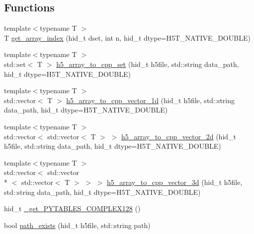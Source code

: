 \subsection*{Functions}
\begin{DoxyCompactItemize}
\item 
{\footnotesize template$<$typename T $>$ }\\T \hyperlink{namespaceh5wrap_aa1fe2dffc1fcbde11e7ceaf3fcc57cfd}{get\-\_\-array\-\_\-index} (hid\-\_\-t dset, int n, hid\-\_\-t dtype=H5\-T\-\_\-\-N\-A\-T\-I\-V\-E\-\_\-\-D\-O\-U\-B\-L\-E)
\item 
{\footnotesize template$<$typename T $>$ }\\std\-::set$<$ T $>$ \hyperlink{namespaceh5wrap_ab8c97f180ec4885c15b275a41447912f}{h5\-\_\-array\-\_\-to\-\_\-cpp\-\_\-set} (hid\-\_\-t h5file, std\-::string data\-\_\-path, hid\-\_\-t dtype=H5\-T\-\_\-\-N\-A\-T\-I\-V\-E\-\_\-\-D\-O\-U\-B\-L\-E)
\item 
{\footnotesize template$<$typename T $>$ }\\std\-::vector$<$ T $>$ \hyperlink{namespaceh5wrap_ab927484b5e446d3325d8fc88b00f3e85}{h5\-\_\-array\-\_\-to\-\_\-cpp\-\_\-vector\-\_\-1d} (hid\-\_\-t h5file, std\-::string data\-\_\-path, hid\-\_\-t dtype=H5\-T\-\_\-\-N\-A\-T\-I\-V\-E\-\_\-\-D\-O\-U\-B\-L\-E)
\item 
{\footnotesize template$<$typename T $>$ }\\std\-::vector$<$ std\-::vector$<$ T $>$ $>$ \hyperlink{namespaceh5wrap_a0cc2fdb859631d95b9fe1dd85954f359}{h5\-\_\-array\-\_\-to\-\_\-cpp\-\_\-vector\-\_\-2d} (hid\-\_\-t h5file, std\-::string data\-\_\-path, hid\-\_\-t dtype=H5\-T\-\_\-\-N\-A\-T\-I\-V\-E\-\_\-\-D\-O\-U\-B\-L\-E)
\item 
{\footnotesize template$<$typename T $>$ }\\std\-::vector$<$ std\-::vector\\*
$<$ std\-::vector$<$ T $>$ $>$ $>$ \hyperlink{namespaceh5wrap_a30f0c9d34b6e369db5807362b8e1c1be}{h5\-\_\-array\-\_\-to\-\_\-cpp\-\_\-vector\-\_\-3d} (hid\-\_\-t h5file, std\-::string data\-\_\-path, hid\-\_\-t dtype=H5\-T\-\_\-\-N\-A\-T\-I\-V\-E\-\_\-\-D\-O\-U\-B\-L\-E)
\item 
hid\-\_\-t \hyperlink{namespaceh5wrap_a2ddc38d8445aba6996a31fc0dde6b7bf}{\-\_\-get\-\_\-\-P\-Y\-T\-A\-B\-L\-E\-S\-\_\-\-C\-O\-M\-P\-L\-E\-X128} ()
\item 
bool \hyperlink{namespaceh5wrap_ae8e8e2bdbaffb31ee8066260d3c68518}{path\-\_\-exists} (hid\-\_\-t h5file, std\-::string path)
\end{DoxyCompactItemize}


